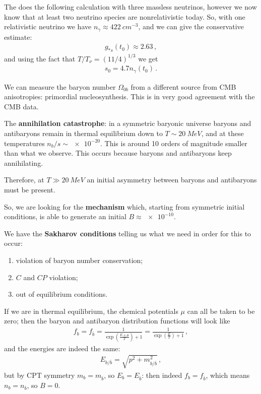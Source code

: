 \documentclass[main.tex]{subfiles}
\begin{document}
The \textcite{kolbEarlyUniverse1994} does the following calculation with three massless neutrinos, however we now know that at least two neutrino species are nonrelativistic today. 
So, with one relativistic neutrino we have \(n_\gamma \approx \SI{422}{cm^{-3}}\), and we can give the conservative estimate:
%
\begin{align}
g_{*s}(t_0 ) \approx \num{2.63}
\,,
\end{align}
%
and using the fact that \( T / T_\nu = (11/4)^{1/3}\) we get 
%
\begin{align}
s_0 = \num{4.7} n_\gamma (t_0 )
\,.
\end{align}

We can measure the baryon number \(\Omega_{0b}\) from a different source from CMB anisotropies: primordial nucleosynthesis. 
This is in very good agreement with the CMB data. 

The \textbf{annihilation catastrophe}: in a symmetric baryonic universe baryons and antibaryons remain in thermal equilibrium down to \(T \sim \SI{20}{MeV}\), and at these temperatures \(n_b / s \sim \num{e-20}\). 
This is around 10 orders of magnitude smaller than what we observe. 
This occurs because baryons and antibaryons keep annihilating. 

Therefore, at \(T \gg \SI{20}{MeV}\) an initial asymmetry between baryons and antibaryons must be present. 

So, we are looking for the \textbf{mechanism} which, starting from symmetric initial conditions, is able to generate an initial \(B \approx \num{e-10}\).

We have the \textbf{Sakharov conditions} telling us what we need in order for this to occur: 
\begin{enumerate}
    \item violation of baryon number conservation;
    \item \(C\) and \(CP\) violation;
    \item out of equilibrium conditions.
\end{enumerate}

If we are in thermal equilibrium, the chemical potentials \(\mu \) can all be taken to be zero; then the baryon and antibaryon distribution functions will look like 
%
\begin{align}
f_b = f_{\overline{b}} = \frac{1}{\exp(\frac{E \pm \mu }{T}) + 1} = \frac{1}{\exp(\frac{E}{T}) + 1}
\,,
\end{align}
%
and the energies are indeed the same: 
%
\begin{align}
E_{b / \overline{b}} = \sqrt{p^2 + m_{b / \overline{b}}^2}
\,,
\end{align}
%
but by CPT symmetry \(m_b = m_{\overline{b}}\), so \(E_b = E_{\overline{b}}\): then indeed \(f_b = f_{\overline{b}}\), which means \(n_b = n_{\overline{b}}\), so \(B = 0\).
\end{document}
